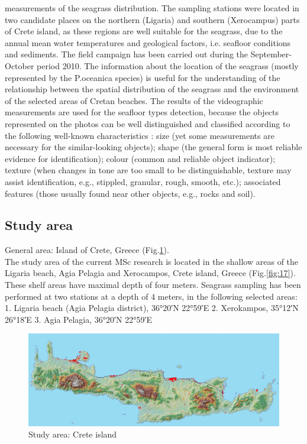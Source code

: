 \documentclass[10pt, a4paper]{article}
\begin{document}
measurements of the seagrass distribution.
The sampling stations were located in two candidate places on the northern (Ligaria) and southern
(Xerocampus) parts of Crete island, as these regions are well suitable for the seagrass, due to the
annual mean water temperatures and geological factors, i.e. seafloor conditions and sediments. The
field campaign has been carried out during the September-October period 2010. 
The information about the location of the seagrass (mostly represented by the P.oceanica species) is useful for the
understanding of the relationship between the spatial distribution of the seagrass and the environment
of the selected areas of Cretan beaches. The results of the videographic measurements are used for the
seafloor types detection, because the objects represented on the photos can be well distinguished and
classified according to the following well-known characteristics \cite{Butler87}\label{Butler87}: size (yet some
measurements are necessary for the similar-looking objects); shape (the general form is most reliable
evidence for identification); colour (common and reliable object indicator); texture (when changes in
tone are too small to be distinguishable, texture may assist identification, e.g., stippled, granular,
rough, smooth, etc.); associated features (those usually found near other objects, e.g., rocks and soil).

\subsection{Study area}
General area: Island of Crete, Greece (Fig.\ref{fig:16}).\\
The study area of the current MSc research is located in the shallow areas of the Ligaria beach, Agia
Pelagia and Xerocampos, Crete island, Greece (Fig.\ref{fig:17}). These shelf areas have maximal depth of four meters.
Seagrass sampling has been performed at two stations at a depth of 4 meters, in the following selected
areas:
1. Ligaria beach (Agia Pelagia district), 36°20′N 22°59′E
2. Xerokampos, 35°12′N 26°18′E
3. Agia Pelagia, 36°20′N 22°59′E

\begin{figure}[h]
	\centering
	\includegraphics[scale=0.10]{Fig-16.jpg}
	\caption{Study area: Crete island}
	\label{fig:16}
\end{figure}
\end{document}
